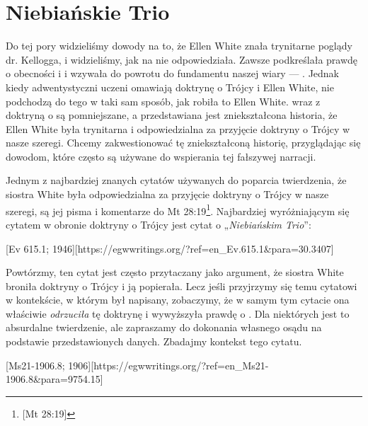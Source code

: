 \chapter{Niebiańskie Trio}

Do tej pory widzieliśmy dowody na to, że Ellen White znała trynitarne poglądy dr. Kellogga, i widzieliśmy, jak na nie odpowiedziała. Zawsze podkreślała prawdę o obecności i  i wzywała do powrotu do fundamentu naszej wiary — . Jednak kiedy adwentystyczni uczeni omawiają doktrynę o Trójcy i Ellen White, nie podchodzą do tego w taki sam sposób, jak robiła to Ellen White.  wraz z doktryną o  są pomniejszane, a przedstawiana jest zniekształcona historia, że Ellen White była trynitarna i odpowiedzialna za przyjęcie doktryny o Trójcy w nasze szeregi. Chcemy zakwestionować tę zniekształconą historię, przyglądając się dowodom, które często są używane do wspierania tej fałszywej narracji.

Jednym z najbardziej znanych cytatów używanych do poparcia twierdzenia, że siostra White była odpowiedzialna za przyjęcie doktryny o Trójcy w nasze szeregi, są jej pisma i komentarze do Mt 28:19\footnote{[Mt 28:19]}. Najbardziej wyróżniającym się cytatem w obronie doktryny o Trójcy jest cytat o „\textit{Niebiańskim Trio}”:

[Ev 615.1; 1946][https://egwwritings.org/?ref=en\_Ev.615.1&para=30.3407]

Powtórzmy, ten cytat jest często przytaczany jako argument, że siostra White broniła doktryny o Trójcy i ją popierała. Lecz jeśli przyjrzymy się temu cytatowi w kontekście, w którym był napisany, zobaczymy, że w samym tym cytacie ona właściwie \textit{odrzuciła} tę doktrynę i wywyższyła prawdę o . Dla niektórych jest to absurdalne twierdzenie, ale zapraszamy do dokonania własnego osądu na podstawie przedstawionych danych. Zbadajmy kontekst tego cytatu.

[Ms21-1906.8; 1906][https://egwwritings.org/?ref=en\_Ms21-1906.8&para=9754.15]


